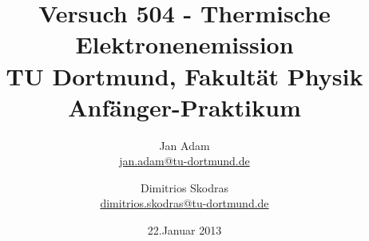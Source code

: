 



\title{Versuch 504 - Thermische Elektronenemission\\				%
\large TU Dortmund, Fakultät Physik\\ 
\normalsize Anfänger-Praktikum}

\author{Jan Adam\\			%
{\small \href{jan.adam@tu-dortmund.de}{jan.adam@tu-dortmund.de}}	%
\and						%
Dimitrios Skodras\\					%
{\small \href{dimitrios.skodras@tu-dortmund.de}{dimitrios.skodras@tu-dortmund.de}}		%
}
\date{22.Januar 2013}				%





\maketitle					%
\thispagestyle{empty} 				%



\tableofcontents


\newpage					%


